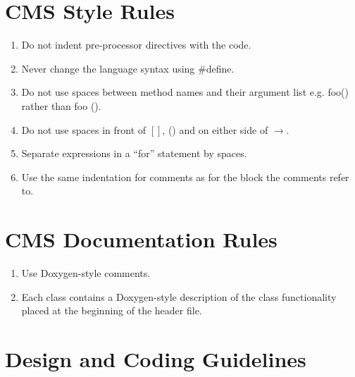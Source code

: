 \documentclass{cmspaper}
\begin{document}
\section{CMS Style Rules}

\begin{enumerate}

\item Do not indent pre-processor directives with the code.
\item Never change the language syntax using \#define.
\item Do not use spaces between method names and their argument list
  e.g. foo() rather than foo ().
\item Do not use spaces in front of \([]\), () and on either side of 
  \(\rightarrow\). 
\item Separate expressions in a ``for'' statement by spaces.
\item Use the same indentation for comments as for the block the comments refer to.

\end{enumerate}

\section{CMS Documentation Rules}

\begin{enumerate}

\item Use Doxygen-style comments.
\item Each class contains a Doxygen-style description of the class
  functionality placed at the beginning of the header file.

\end{enumerate}

\section{Design and Coding Guidelines}
\end{document}
